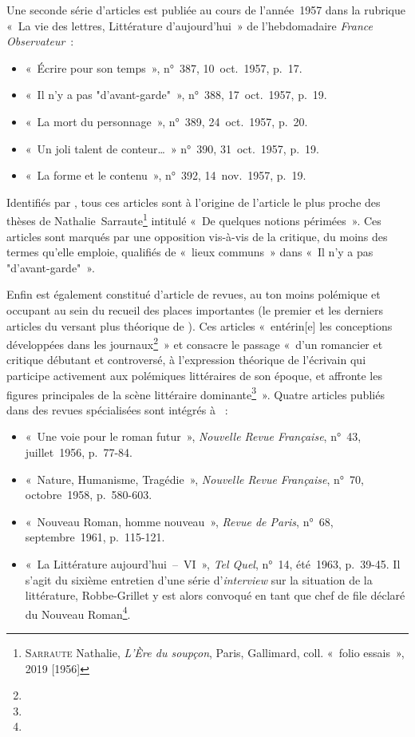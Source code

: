 \documentclass[12pt, a4paper]{article}
\begin{document}
Une seconde série d'articles est publiée au cours de l'année~1957 dans la rubrique «~La vie des lettres, Littérature d’aujourd’hui~» de l'hebdomadaire \textit{France Observateur}~:
\begin{itemize}
    \item «~Écrire pour son temps~», n°~387, 10~oct.~1957, p.~17.
    \item «~Il n’y a pas "d’avant-garde"~», n°~388, 17~oct.~1957, p.~19.
    \item «~La mort du personnage~», n°~389, 24~oct.~1957, p.~20.
    \item «~Un joli talent de conteur…~» n°~390, 31~oct.~1957, p.~19.
    \item «~La forme et le contenu~», n°~392, 14~nov.~1957, p.~19.
\end{itemize}
Identifiés par \galia, tous ces articles sont à l'origine de l'article le plus proche des thèses de Nathalie~Sarraute\footnote{\textsc{Sarraute} Nathalie, \textit{L'Ère du soupçon}, Paris, Gallimard, coll. «~folio essais~», 2019 [1956]} intitulé «~De quelques notions périmées~». Ces articles sont marqués par une opposition vis-à-vis de la critique, du moins des termes qu'elle emploie, qualifiés de «~lieux communs~» dans «~Il n’y a pas "d’avant-garde"~».

Enfin \punr{} est également constitué d'article de revues, au ton moins polémique et occupant au sein du recueil des places importantes (le premier et les derniers articles du versant plus théorique de \punr). Ces articles «~entérin[e] les conceptions développées dans les journaux\footnote{}~» et consacre le passage «~d’un romancier et critique débutant et controversé, à l’expression théorique de l’écrivain qui participe activement aux polémiques littéraires de son époque, et affronte les figures principales de la scène littéraire dominante\footnote{}~». Quatre articles publiés dans des revues spécialisées sont intégrés à \punr~:
\begin{itemize}
    \item «~Une voie pour le roman futur~», \textit{Nouvelle Revue Française}, n°~43, juillet~1956, p.~77-84.
    \item «~Nature, Humanisme, Tragédie~», \textit{Nouvelle Revue Française}, n°~70, octobre~1958, p.~580-603.
    \item «~Nouveau Roman, homme nouveau~», \textit{Revue de Paris}, n°~68, septembre~1961, p.~115-121.
    \item «~La Littérature aujourd'hui~–~VI~», \textit{Tel Quel}, n°~14, été~1963, p.~39-45. Il s'agit du sixième entretien d'une série d'\textit{interview} sur la situation de la littérature, Robbe-Grillet y est alors convoqué en tant que chef de file déclaré du Nouveau Roman\footnote{}.
\end{itemize}
\end{document}
